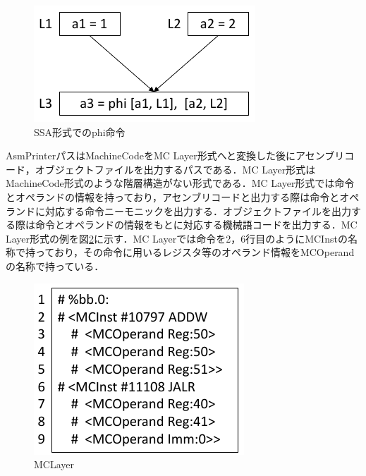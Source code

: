 \begin{figure}[tb]
    \centering
    \includegraphics[scale=1.0]{image/phi_function.pdf}
    \caption{SSA形式でのphi命令}
    \label{fig:phi_func}
\end{figure}

AsmPrinterパスはMachineCodeをMC Layer形式へと変換した後にアセンブリコード，オブジェクトファイルを出力するパスである．MC Layer形式はMachineCode形式のような階層構造がない形式である．MC Layer形式では命令とオペランドの情報を持っており，アセンブリコードと出力する際は命令とオペランドに対応する命令ニーモニックを出力する．オブジェクトファイルを出力する際は命令とオペランドの情報をもとに対応する機械語コードを出力する．MC Layer形式の例を図\ref{fig:MCLayer}に示す．MC Layerでは命令を2，6行目のようにMCInstの名称で持っており，その命令に用いるレジスタ等のオペランド情報をMCOperandの名称で持っている．

\begin{figure}[tb]
    \centering
    \includegraphics[scale=1.0]{image/MCLayer.pdf}
    \caption{MCLayer}
    \label{fig:MCLayer}
\end{figure}